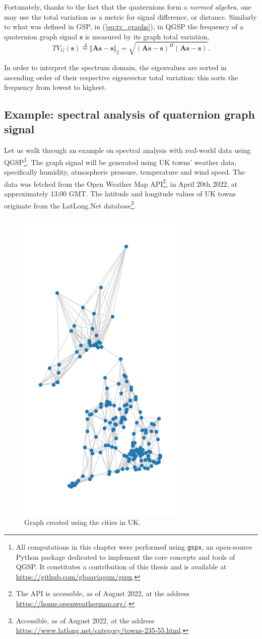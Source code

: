 Fortunately, thanks to the fact that the quaternions form a \textit{normed algebra}, one may use the total variation as a metric for signal difference, or distance. Similarly to what was defined in GSP, in (\ref{eq:tv_graphs}), in QGSP the frequency of a quaternion graph signal $\mathbf{s}$ is measured by its graph total variation,
\begin{equation}
\label{eq:tv_graphs_q}
TV_G(\mathbf{s}) \overset{\Delta}{=} \Vert \mathbf{A} \mathbf{s} - \mathbf{s}\Vert_2 = \sqrt{(\mathbf{A} \mathbf{s} - \mathbf{s})^H (\mathbf{A} \mathbf{s} - \mathbf{s})}.
\end{equation}

In order to interpret the spectrum domain, the eigenvalues are sorted in ascending order of their respective eigenvector total variation: this sorts the frequency from lowest to highest.

\subsection{Example: spectral analysis of quaternion graph signal}

Let us walk through an example on spectral analysis with real-world data using QGSP\footnote{All computations in this chapter were performed using \texttt{gspx}, an open-source Python package dedicated to implement the core concepts and tools of QGSP. It constitutes a contribution of this thesis and is available at \url{https://github.com/gboaviagem/gspx}.}. The graph signal will be generated using UK towns' weather data, specifically humidity, atmospheric pressure, temperature and wind speed. The data was fetched from the Open Weather Map API\footnote{The API is accessible, as of August 2022, at the address \url{https://home.openweathermap.org/}.}, in April 20th 2022, at approximately 13:00 GMT. The latitude and longitude values of UK towns originate from the LatLong.Net database\footnote{Accessible, as of August 2022, at the address \url{https://www.latlong.net/category/towns-235-55.html}.}.

\begin{figure}
	\centering
	\includegraphics[width=0.3\linewidth]{thesis/Figures/uk_qgsp_graph.png}
	\caption{Graph created using the cities in UK.}
	\label{fig:uk_graph}
\end{figure}


